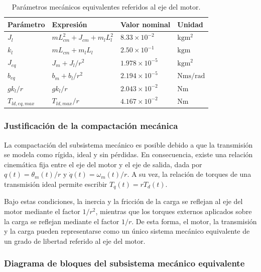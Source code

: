 \documentclass[10pt,a4paper]{article}
\begin{document}
\begin{table}[H]
    \centering
    \caption{Parámetros mecánicos equivalentes referidos al eje del motor.}
    \label{tab:parametros_equivalentes}
    \begin{tabular}{llll}
        \toprule
        Parámetro & Expresión & Valor nominal & Unidad \\
        \midrule
        \(J_l\) & \(mL_{cm}^{2}+J_{cm}+m_lL_l^2\) & \(8.33\times10^{-2}\) & \(\si{\kilogram\meter\squared}\) \\
        \(k_l\) & \(mL_{cm}+m_lL_l\) & \(2.50\times10^{-1}\) & \(\si{\kilogram\meter}\) \\
        \(J_{eq}\) & \(J_m+J_l/r^2\) & \(1.978\times10^{-5}\) & \(\si{\kilogram\meter\squared}\) \\
        \(b_{eq}\) & \(b_m+b_l/r^2\) & \(2.194\times10^{-5}\) & \(\si{\newton\meter\second\per\radian}\) \\
        \(gk_l/r\) & \(gk_l/r\) & \(2.043\times10^{-2}\) & \(\si{\newton\meter}\) \\
        \(T_{ld,eq,max}\) & \(T_{ld,max}/r\) & \(4.167\times10^{-2}\) & \(\si{\newton\meter}\) \\
        \bottomrule
    \end{tabular}
\end{table}

\subsubsection{Justificación de la compactación mecánica}

La compactación del subsistema mecánico es posible debido a que la transmisión se modela como rígida, ideal y sin pérdidas. En consecuencia, existe una relación cinemática fija entre el eje del motor y el eje de salida, dada por \(q(t)=\theta_m(t)/r\) y \(\dot{q}(t)=\omega_m(t)/r\). A su vez, la relación de torques de una transmisión ideal permite escribir \(T_q(t)=rT_d(t)\).

Bajo estas condiciones, la inercia y la fricción de la carga se reflejan al eje del motor mediante el factor \(1/r^2\), mientras que los torques externos aplicados sobre la carga se reflejan mediante el factor \(1/r\). De esta forma, el motor, la transmisión y la carga pueden representarse como un único sistema mecánico equivalente de un grado de libertad referido al eje del motor.

\subsubsection{Diagrama de bloques del subsistema mecánico equivalente}
\end{document}

